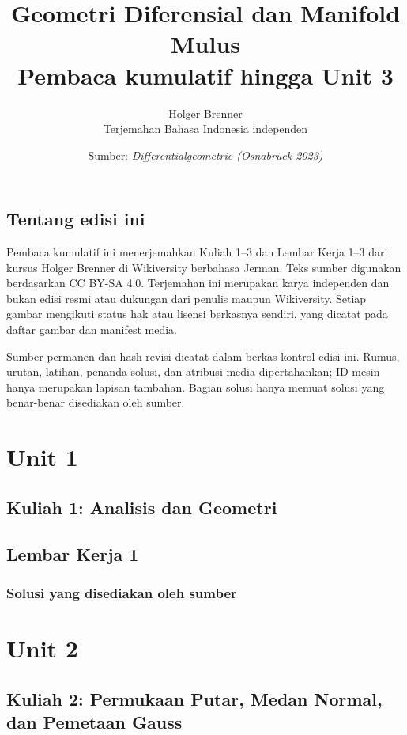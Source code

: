 \documentclass[11pt,a4paper,oneside]{book}
\title{Geometri Diferensial dan Manifold Mulus\\\large Pembaca kumulatif hingga Unit 3}
\author{Holger Brenner\\Terjemahan Bahasa Indonesia independen}
\date{Sumber: \textit{Differentialgeometrie (Osnabrück 2023)}}
\begin{document}
\hypersetup{pageanchor=false}
\maketitle
\hypersetup{pageanchor=true}
\frontmatter
\chapter*{Tentang edisi ini}
Pembaca kumulatif ini menerjemahkan Kuliah 1--3 dan Lembar Kerja 1--3 dari kursus Holger Brenner di Wikiversity berbahasa Jerman. Teks sumber digunakan berdasarkan CC BY-SA 4.0. Terjemahan ini merupakan karya independen dan bukan edisi resmi atau dukungan dari penulis maupun Wikiversity. Setiap gambar mengikuti status hak atau lisensi berkasnya sendiri, yang dicatat pada daftar gambar dan manifest media.

Sumber permanen dan hash revisi dicatat dalam berkas kontrol edisi ini. Rumus, urutan, latihan, penanda solusi, dan atribusi media dipertahankan; ID mesin hanya merupakan lapisan tambahan. Bagian solusi hanya memuat solusi yang benar-benar disediakan oleh sumber.
\tableofcontents

\mainmatter
\part{Unit 1}
\chapter[Kuliah 1]{Kuliah 1: Analisis dan Geometri}


\chapter{Lembar Kerja 1}


\section*{Solusi yang disediakan oleh sumber}


\part{Unit 2}
\chapter[Kuliah 2]{Kuliah 2: Permukaan Putar, Medan Normal, dan Pemetaan Gauss}

\end{document}
